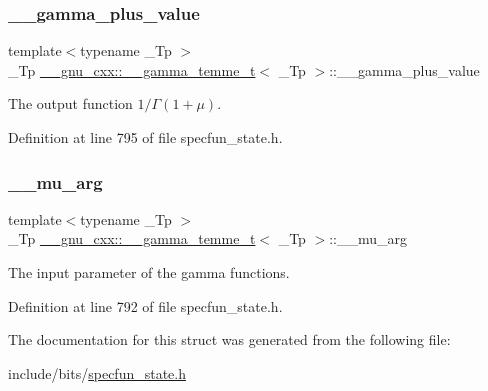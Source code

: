 \subsubsection{\texorpdfstring{\+\_\+\+\_\+gamma\+\_\+plus\+\_\+value}{\_\_gamma\_plus\_value}}
{\footnotesize\ttfamily template$<$typename \+\_\+\+Tp $>$ \\
\+\_\+\+Tp \hyperlink{struct____gnu__cxx_1_1____gamma__temme__t}{\+\_\+\+\_\+gnu\+\_\+cxx\+::\+\_\+\+\_\+gamma\+\_\+temme\+\_\+t}$<$ \+\_\+\+Tp $>$\+::\+\_\+\+\_\+gamma\+\_\+plus\+\_\+value}



The output function $ 1/\Gamma(1 + \mu) $. 



Definition at line 795 of file specfun\+\_\+state.\+h.

\mbox{\label{struct____gnu__cxx_1_1____gamma__temme__t_a841e7c549dd505de260018ddaa020565}} 
\subsubsection{\texorpdfstring{\+\_\+\+\_\+mu\+\_\+arg}{\_\_mu\_arg}}
{\footnotesize\ttfamily template$<$typename \+\_\+\+Tp $>$ \\
\+\_\+\+Tp \hyperlink{struct____gnu__cxx_1_1____gamma__temme__t}{\+\_\+\+\_\+gnu\+\_\+cxx\+::\+\_\+\+\_\+gamma\+\_\+temme\+\_\+t}$<$ \+\_\+\+Tp $>$\+::\+\_\+\+\_\+mu\+\_\+arg}



The input parameter of the gamma functions. 



Definition at line 792 of file specfun\+\_\+state.\+h.



The documentation for this struct was generated from the following file\+:\begin{DoxyCompactItemize}
\item 
include/bits/\hyperlink{specfun__state_8h}{specfun\+\_\+state.\+h}\end{DoxyCompactItemize}

